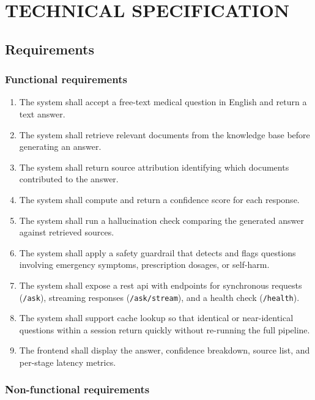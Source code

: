 \chapter{\MakeUppercase{Technical Specification}}

\section{Requirements}

\subsection{Functional requirements}

\begin{enumerate}
    \item The system shall accept a free-text medical question in English and return a text answer.
    \item The system shall retrieve relevant documents from the knowledge base before generating an answer.
    \item The system shall return source attribution identifying \allowbreak{}which documents contributed to the answer.
    \item The system shall compute and return a confidence score for each response.
    \item The system shall run a hallucination check comparing \allowbreak{}the generated answer against retrieved sources.
    \item The system shall apply a safety guardrail that detects and flags questions involving emergency symptoms, prescription dosages, or self-harm.
    \item The system shall expose a \ac{rest} \ac{api} with endpoints for synchronous requests (\texttt{/ask}), streaming responses (\texttt{/ask/stream}), and a health check (\texttt{/health}).
    \item The system shall support cache lookup so that identical or near-identical questions within a session return quickly without re-running the full pipeline.
    \item The frontend shall display the answer, confidence breakdown, source list, and per-stage latency metrics.
\end{enumerate}

\subsection{Non-functional requirements}

